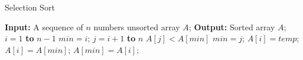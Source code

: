 \documentclass[review, authoryear, 3p, 12pt]{elsarticle}
\begin{document}
	\begin{algorithm}[htbp]
		\caption{Selection Sort}
		\label{alg:tsh}
		\begin{codebox}
			\zi		\textbf{Input:} A sequence of $n$ numbers unsorted array $A$;
			\zi 	\textbf{Output:} Sorted array $A$;
			\li 	\For $i=1$ \textbf{to} $n-1$
					\Do
			\li 		$min = i$;
			\li 		\For $j=i+1$ \textbf{to} $n$
			 			\Do
			\li 			\If $A[j] < A[min]$
							\Then
			\li 				$min = j$;
 							\End
						\End
			\li			$A[i]=temp$;
			\li 		$A[i]=A[min]$;
			\li 		$A[min]=A[i]$;
					\End
		\end{codebox}
	\end{algorithm}
\end{document}
